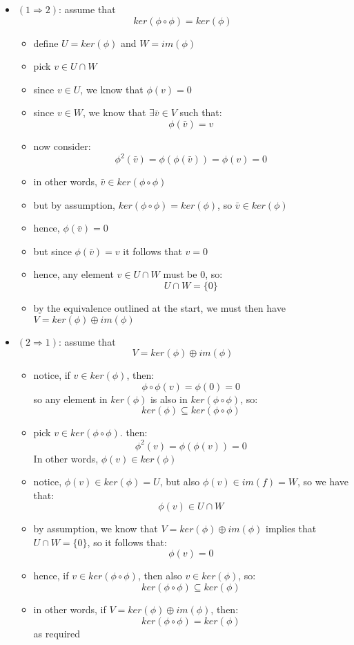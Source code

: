 \documentclass{exam}
\begin{document}
\begin{questions}
\begin{itemize}
    \item $(1 \Longrightarrow 2)$: assume that
    \[
    ker(\phi \circ \phi) = ker(\phi)
    \]
    \begin{itemize}
        \item define $U = ker(\phi)$ and $W = im(\phi)$
        \item pick $v \in U \cap W$
        \item since $v \in U$, we know that $\phi(v) = 0$
        \item since $v \in W$, we know that $\exists \bar{v} \in V$ such that:
        \[
        \phi(\bar{v}) = v
        \]
        \item now consider:
        \[
        \phi^2(\bar{v}) = \phi(\phi(\bar{v})) = \phi(v) = 0
        \]
        \item in other words, $\bar{v} \in ker(\phi \circ \phi)$
        \item but by assumption, $ker(\phi \circ \phi) = ker(\phi)$, so $\bar{v} \in ker(\phi)$
        \item hence, $\phi(\bar{v}) = 0$
        \item but since $\phi(\bar{v}) = v$ it follows that $v = 0$
        \item hence, any element $v \in U \cap W$ must be 0, so:
        \[
         U \cap W = \{0\}
        \]
        \item by the equivalence outlined at the start, we must then have $V = ker(\phi) \oplus im(\phi)$
    \end{itemize}
    \item $(2 \Longrightarrow 1)$: assume that
    \[
    V = ker(\phi) \oplus im(\phi)
    \]
    \begin{itemize}
        \item notice, if $v \in ker(\phi)$, then:
        \[
        \phi \circ \phi(v) = \phi(0) = 0
        \]
        so any element in $ker(\phi)$ is also in $ker(\phi \circ \phi)$, so:
        \[
        ker(\phi) \subseteq ker(\phi \circ \phi)
        \]
        \item pick $v \in ker(\phi \circ \phi)$. then:
        \[
        \phi^2(v) = \phi(\phi(v)) = 0
        \]
        In other words, $\phi(v) \in ker(\phi)$
        \item notice, $\phi(v) \in ker(\phi) = U$, but also $\phi(v) \in im(f) = W$, so we have that:
        \[
        \phi(v) \in U \cap W
        \]
        \item by assumption, we know that $V = ker(\phi) \oplus im(\phi)$ implies that $U \cap W = \{0\}$, so it follows that:
        \[
        \phi(v) = 0
        \]
        \item hence, if $v \in ker(\phi \circ \phi)$, then also $v \in ker(\phi)$, so:
        \[
        ker(\phi \circ \phi) \subseteq ker(\phi)
        \]
        \item in other words, if $V = ker(\phi) \oplus im(\phi)$, then:
        \[
        ker(\phi \circ \phi) = ker(\phi)
        \]
        as required
    \end{itemize}
\end{itemize}


\end{questions}
\end{document}
